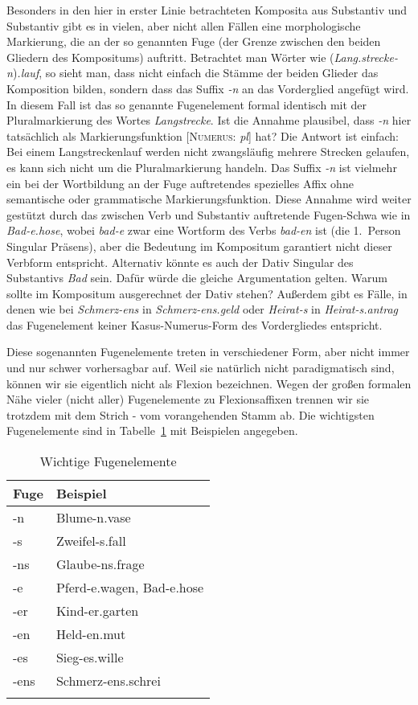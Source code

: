 Besonders in den hier in erster Linie betrachteten Komposita aus Substantiv und Substantiv gibt es in vielen, aber nicht allen Fällen eine morphologische Markierung, die an der so genannten Fuge (der Grenze zwischen den beiden Gliedern des Kompositums) auftritt.
Betrachtet man Wörter wie (\textit{Lang.strecke-n})\textit{.lauf}, so sieht man, dass nicht einfach die Stämme der beiden Glieder das Komposition bilden, sondern dass das Suffix \textit{-n} an das Vorderglied angefügt wird.
In diesem Fall ist das so genannte Fugenelement formal identisch mit der Pluralmarkierung des Wortes \textit{Langstrecke}.
Ist die Annahme plausibel, dass \textit{-n} hier tatsächlich als Markierungsfunktion [\textsc{Numerus}: \textit{pl}] hat?
Die Antwort ist einfach:
Bei einem Langstreckenlauf werden nicht zwangsläufig mehrere Strecken gelaufen, es kann sich nicht um die Pluralmarkierung handeln.
Das Suffix \textit{-n} ist vielmehr ein bei der Wortbildung an der Fuge auftretendes spezielles Affix ohne semantische oder grammatische Markierungsfunktion.
Diese Annahme wird weiter gestützt durch das zwischen Verb und Substantiv auftretende Fugen-Schwa wie in \textit{Bad-e.hose}, wobei \textit{bad-e} zwar eine Wortform des Verbs \textit{bad-en} ist (\zB die 1.~Person Singular Präsens), aber die Bedeutung im Kompositum garantiert nicht dieser Verbform entspricht.
Alternativ könnte es auch der Dativ Singular des Substantivs \textit{Bad} sein.
Dafür würde die gleiche Argumentation gelten.
Warum sollte im Kompositum ausgerechnet der Dativ stehen?
Außerdem gibt es Fälle, in denen wie bei \textit{\Ast Schmerz-ens} in \textit{Schmerz-ens.geld} oder \textit{\Ast Heirat-s} in \textit{Heirat-s.antrag} das Fugenelement keiner Kasus-Numerus-Form des Vordergliedes entspricht.

Diese sogenannten Fugenelemente treten in verschiedener Form, aber nicht immer und nur schwer vorhersagbar auf.
Weil sie natürlich nicht paradigmatisch sind, können wir sie eigentlich nicht als Flexion bezeichnen.
Wegen der großen formalen Nähe vieler (nicht aller) Fugenelemente zu Flexionsaffixen trennen wir sie trotzdem mit dem Strich - vom vorangehenden Stamm ab.
Die wichtigsten Fugenelemente sind in Tabelle~\ref{tab:fugen} mit Beispielen angegeben.

\begin{table}[!h]
  \centering
  \begin{tabular}{ll}
    \lsptoprule
    \textbf{Fuge} & \textbf{Beispiel} \\
    \midrule
    -n & Blume-n.vase \\
    -s & Zweifel-s.fall \\
    -ns & Glaube-ns.frage \\
    -e & Pferd-e.wagen, Bad-e.hose \\
    -er & Kind-er.garten \\
    -en & Held-en.mut \\
    -es & Sieg-es.wille \\
    -ens & Schmerz-ens.schrei \\
    \lspbottomrule
  \end{tabular}
  \caption{Wichtige Fugenelemente}
  \label{tab:fugen}
\end{table}

